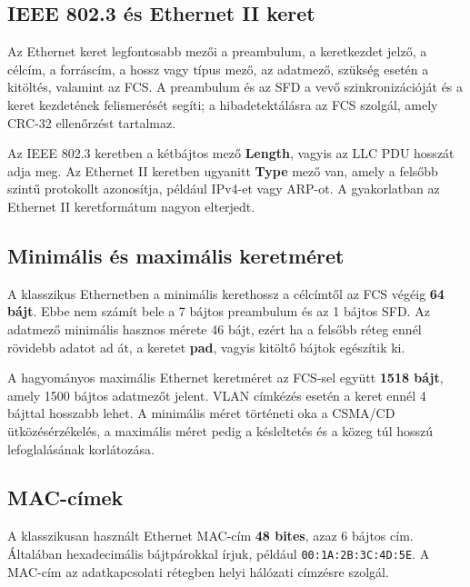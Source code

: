 \subsection{IEEE 802.3 és Ethernet II keret}

Az Ethernet keret legfontosabb mezői a preambulum, a keretkezdet jelző, a célcím, a forráscím, a hossz vagy típus mező, az adatmező, szükség esetén a kitöltés, valamint az FCS. A preambulum és az SFD a vevő szinkronizációját és a keret kezdetének felismerését segíti; a hibadetektálásra az FCS szolgál, amely CRC-32 ellenőrzést tartalmaz.

Az IEEE 802.3 keretben a kétbájtos mező \textbf{Length}, vagyis az LLC PDU hosszát adja meg. Az Ethernet II keretben ugyanitt \textbf{Type} mező van, amely a felsőbb szintű protokollt azonosítja, például IPv4-et vagy ARP-ot. A gyakorlatban az Ethernet II keretformátum nagyon elterjedt.



\begin{center}

\end{center}

\subsection{Minimális és maximális keretméret}

A klasszikus Ethernetben a minimális kerethossz a célcímtől az FCS végéig \textbf{64 bájt}. Ebbe nem számít bele a 7 bájtos preambulum és az 1 bájtos SFD. Az adatmező minimális hasznos mérete 46 bájt, ezért ha a felsőbb réteg ennél rövidebb adatot ad át, a keretet \textbf{pad}, vagyis kitöltő bájtok egészítik ki.

A hagyományos maximális Ethernet keretméret az FCS-sel együtt \textbf{1518 bájt}, amely 1500 bájtos adatmezőt jelent. VLAN címkézés esetén a keret ennél 4 bájttal hosszabb lehet. A minimális méret történeti oka a CSMA/CD ütközésérzékelés, a maximális méret pedig a késleltetés és a közeg túl hosszú lefoglalásának korlátozása.

\subsection{MAC-címek}

A klasszikusan használt Ethernet MAC-cím \textbf{48 bites}, azaz 6 bájtos cím. Általában hexadecimális bájtpárokkal írjuk, például \texttt{00:1A:2B:3C:4D:5E}. A MAC-cím az adatkapcsolati rétegben helyi hálózati címzésre szolgál.


